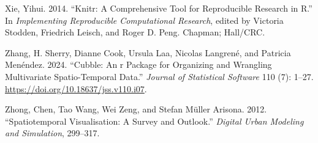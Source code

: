 \begin{CSLReferences}{1}{0}
\leavevmode{}%
Xie, Yihui. 2014. {``Knitr: A Comprehensive Tool for Reproducible Research in {R}.''} In \emph{Implementing Reproducible Computational Research}, edited by Victoria Stodden, Friedrich Leisch, and Roger D. Peng. Chapman; Hall/CRC.

\leavevmode{}%
Zhang, H. Sherry, Dianne Cook, Ursula Laa, Nicolas Langrené, and Patricia Menéndez. 2024. {``Cubble: An r Package for Organizing and Wrangling Multivariate Spatio-Temporal Data.''} \emph{Journal of Statistical Software} 110 (7): 1--27. \url{https://doi.org/10.18637/jss.v110.i07}.

\leavevmode{}%
Zhong, Chen, Tao Wang, Wei Zeng, and Stefan Müller Arisona. 2012. {``Spatiotemporal Visualisation: A Survey and Outlook.''} \emph{Digital Urban Modeling and Simulation}, 299--317.

\end{CSLReferences}


\address{%
Maliny Po\\
Monash University\\%
Department of Econometrics and Business Statistics\\ Melbourne, Australia\\
%
%
\textit{ORCiD: \href{https://orcid.org/0009-0008-4686-6631}{0009-0008-4686-6631}}\\%
\href{mailto:malinypo12@gmail.com}{\nolinkurl{malinypo12@gmail.com}}%
}

\address{%
Nathan Shuyuan Yang\\
Duke University\\%
Durham, North Carolina\\
%
%
\textit{ORCiD: \href{https://orcid.org/0009-0002-9985-1042}{0009-0002-9985-1042}}\\%
\href{mailto:nathan.s.yang@gmail.com}{\nolinkurl{nathan.s.yang@gmail.com}}%
}

\address{%
H. Sherry Zhang\\
University of Texas at Austin\\%
Department of Statistics and Data Sciences\\ Austin, Texas\\
%
%
\textit{ORCiD: \href{https://orcid.org/0000-0002-7122-1463}{0000-0002-7122-1463}}\\%
\href{mailto:huizezhangsh@gmail.com}{\nolinkurl{huizezhangsh@gmail.com}}%
}

\address{%
Dianne Cook\\
Monash University\\%
Department of Econometrics and Business Statistics\\ Melbourne, Australia\\
%
%
\textit{ORCiD: \href{https://orcid.org/0000-0002-3813-7155}{0000-0002-3813-7155}}\\%
\href{mailto:dicook@monash.edu}{\nolinkurl{dicook@monash.edu}}%
}
